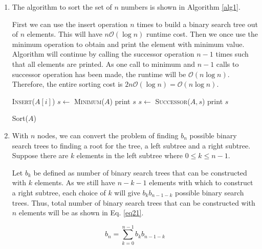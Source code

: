 \begin{enumerate}[label=(\alph*)]
\item The algorithm to sort the set of $n$ numbers is shown in Algorithm \ref{alg1}.

First we can use the insert operation $n$ times to build a binary search tree out of $n$ elements. This will have $n\mathcal{O}(\log n)$ runtime cost. Then we once use the minimum operation to obtain and print the element with minimum value. Algorithm will continue by calling the successor operation $n-1$ times such that all elements are printed. As one call to minimum and $n-1$ calls to successor operation has been made, the runtime will be $\mathcal{O}(n\log n)$. Therefore, the entire sorting cost is $2n\mathcal{O}(\log n) = \mathcal{O}(n\log n)$.

\begin{algorithm}[H]
\begin{algorithmic}[1]
\State \textsc{Insert}($A[i]$)
\EndFor
\State $s \leftarrow$ \textsc{Minimum}($A$)
\State print $s$
\State $s \leftarrow$ \textsc{Successor}($A, s$)
\State print $s$
\EndFor
\end{algorithmic}
\caption{Sort($A$)}\label{alg1}
\end{algorithm}

\item With $n$ nodes, we can convert the problem of finding $b_n$ possible binary search trees to finding a root for the tree, a left subtree and a right subtree. Suppose there are $k$ elements in the left subtree where $0 \leq k \leq n-1$.

Let $b_k$ be defined as number of binary search trees that can be constructed with $k$ elements. As we still have $n-k-1$ elements with which to construct a right subtree, each choice of $k$ will give $b_k b_{n-1-k}$ possible binary search trees. Thus, total number of binary search trees that can be constructed with $n$ elements will be as shown in Eq. \ref{eq21}.

\begin{equation}
b_n = \sum_{k=0}^{n-1} b_k b_{n-1-k}
\label{eq21}
\end{equation}

\end{enumerate}
